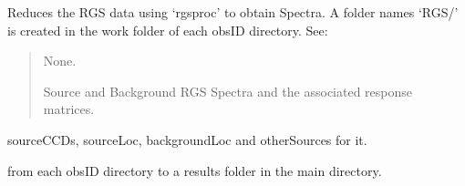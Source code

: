 \documentclass[letterpaper,10pt,english]{sphinxmanual}
\begin{document}
\begin{fulllineitems}
\begin{fulllineitems}
\label{\detokenize{xmmPipeline:xmmPipeline.rgsPipeline.rgsObj.reduceRGSdata}}
\pysigstartsignatures
{}
\pysigstopsignatures
\sphinxAtStartPar
Reduces the RGS data using ‘rgsproc’ to obtain Spectra.
A folder names ‘RGS/’ is created in the work folder of each obsID directory.
See: 
\begin{quote}\begin{description}
\sphinxAtStartPar
None.

\sphinxAtStartPar
Source and Background RGS Spectra and the associated response matrices.

\end{description}\end{quote}

\end{fulllineitems}


\begin{fulllineitems}
\label{\detokenize{xmmPipeline:xmmPipeline.rgsPipeline.rgsObj.save_results}}
\pysigstartsignatures
{}
\pysigstopsignatures\begin{description}
\begin{description}
\sphinxAtStartPar
sourceCCDs, sourceLoc, backgroundLoc and otherSources for it.

\sphinxAtStartPar
from each obsID directory to a results folder in the main directory.

\end{description}

\end{description}

\end{fulllineitems}


\end{fulllineitems}

\end{document}
